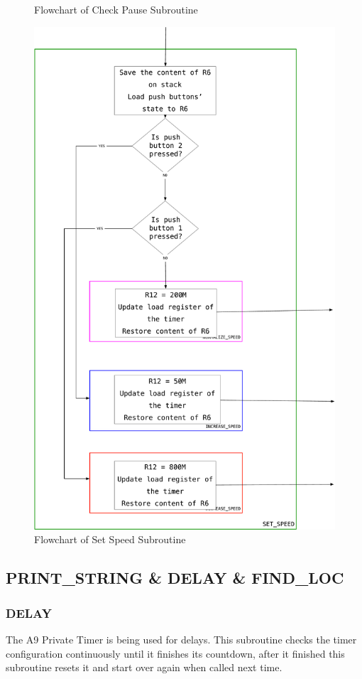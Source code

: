 \documentclass[titlepage]{article}
\begin{document}
\begin{figure}[h]
\begin{minipage}{0.45\textwidth}
			\caption{Flowchart of Check Pause Subroutine}
		\end{minipage}
		\begin{minipage}{0.7\linewidth}
			\centering
			\includegraphics[scale=.3]{../images/set_speed.pdf}
			\caption{Flowchart of Set Speed Subroutine}
		\end{minipage}
	\end{figure}
	\newpage
	\subsection{PRINT\_STRING \& DELAY \& FIND\_LOC}
	\subsubsection{DELAY}
	The A9 Private Timer is being used for delays. This subroutine checks the timer configuration continuously until it finishes its countdown, after it finished this subroutine resets it and start over again when called next time.
\end{document}
